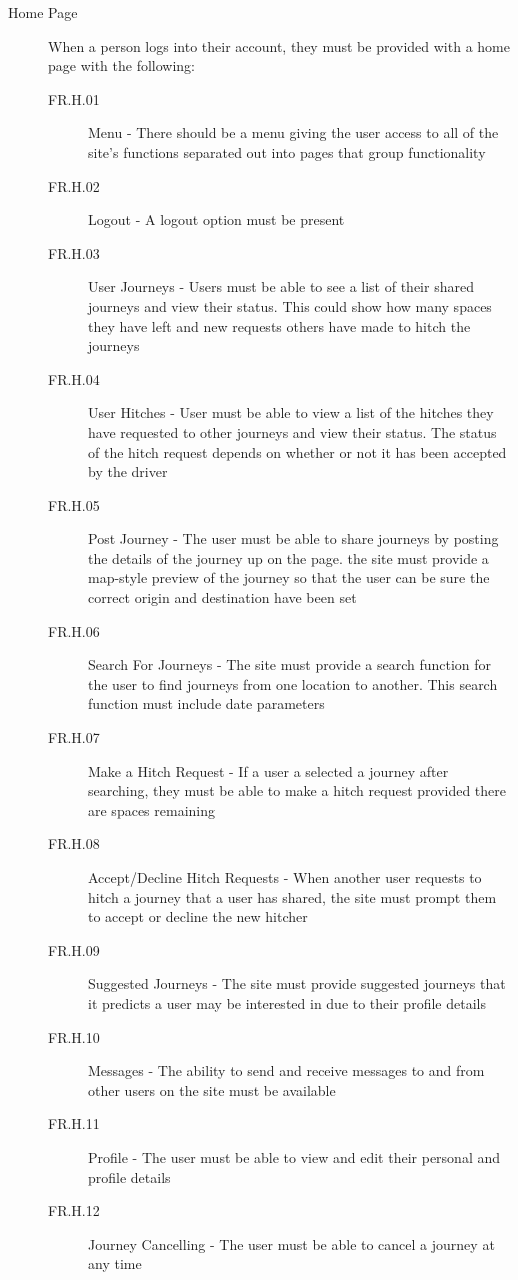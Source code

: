 \documentclass[11pt]{article}
\begin{document}
\begin{description}
\item[Home Page] When a person logs into their account, they must be provided with a home page with the following:
\begin{description}
\item[FR.H.01] Menu - There should be a menu giving the user access to all of the site's functions separated out into pages that group functionality 
\item[FR.H.02] Logout - A logout option must be present
\item[FR.H.03] User Journeys - Users must be able to see a list of their shared journeys and view their status. This could show how many spaces they have left and new requests others have made to hitch the journeys
\item[FR.H.04] User Hitches - User must be able to view a list of the hitches they have requested to other journeys and view their status. The status of the hitch request depends on whether or not it has been accepted by the driver
\item[FR.H.05] Post Journey - The user must be able to share journeys by posting the details of the journey up on the page. the site must provide a map-style preview of the journey so that the user can be sure the correct origin and destination have been set
\item[FR.H.06] Search For Journeys - The site must provide a search function for the user to find journeys from one location to another. This search function must include date parameters
\item[FR.H.07] Make a Hitch Request - If a user a selected a journey after searching, they must be able to make a hitch request provided there are spaces remaining
\item[FR.H.08] Accept/Decline Hitch Requests - When another user requests to hitch a journey that a user has shared, the site must prompt them to accept or decline the new hitcher
\item[FR.H.09] Suggested Journeys - The site must provide suggested journeys that it predicts a user may be interested in due to their profile details
\item[FR.H.10] Messages - The ability to send and receive messages to and from other users on the site must be available
\item[FR.H.11] Profile - The user must be able to view and edit their personal and profile details 
\item[FR.H.12] Journey Cancelling - The user must be able to cancel a journey at any time
\end{description}


\end{description}
\end{document}

